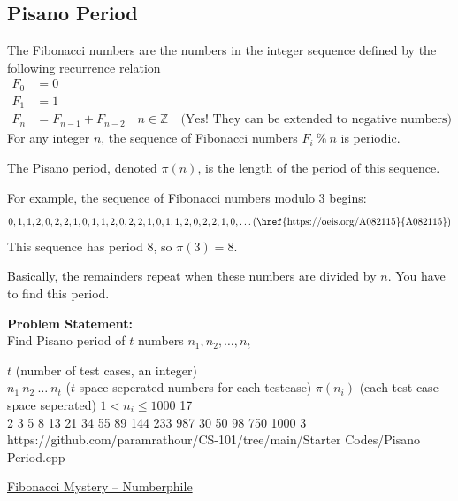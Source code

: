 \documentclass[../../Problems]{subfiles}
\begin{document}
\subsection{Pisano Period}
The Fibonacci numbers are the numbers in the integer sequence defined by the following recurrence relation
\begin{equation}
	\begin{aligned}
		F_0 &= 0\\
		F_1 &= 1 \\
		F_n &= F_{n-1} + F_{n-2}\quad n \in \mathbb{Z}\quad\text{(Yes! They can be extended to negative numbers)}
	\end{aligned}
\end{equation}
For any integer $n$, the sequence of Fibonacci numbers $F_i \ \%\ n$ is periodic.

The Pisano period, denoted $\pi(n)$, is the length of the period of this sequence.

For example, the sequence of Fibonacci numbers modulo $3$ begins:
\begin{equation*}
	0, 1, 1, 2, 0, 2, 2, 1, 0, 1, 1, 2, 0, 2, 2, 1, 0, 1, 1, 2, 0, 2, 2, 1, 0,\ldots\text{(\href{https://oeis.org/A082115}{A082115})}
\end{equation*}
This sequence has period $8$, so $\pi(3) = 8$.

Basically, the remainders repeat when these numbers are divided by $n$. You have to find this period.

\textbf{Problem Statement:}\\
Find Pisano period of $t$ numbers $n_1,n_2,\ldots,n_t$
\begin{testcases}
	{$t$ \hfill(number of test cases, an integer)\\
	$n_1\ n_2\ \ldots\ n_t$ \hfill($t$ space seperated numbers for each testcase)}
	{$\pi(n_i)$ \hfill(each test case space seperated)}
	{$1 < n_i \leq 1000$}
	{17\\2 3 5 8 13 21 34 55 89 144 233 987 30 50 98 750 1000}
	{3}
	{https://github.com/paramrathour/CS-101/tree/main/Starter Codes/Pisano Period.cpp}
\end{testcases}
\begin{funvideo}
\href{https://youtu.be/Nu-lW-Ifyec}{Fibonacci Mystery -- Numberphile}
\end{funvideo}
\end{document}
